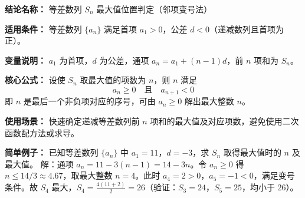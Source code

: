 \textbf{结论名称：} 等差数列 \(S_n\) 最大值位置判定（邻项变号法）

\textbf{适用条件：} 等差数列 \(\{a_n\}\) 满足首项 \(a_1>0\)，公差 \(d<0\)（递减数列且首项为正）。

\textbf{变量说明：} \(a_1\) 为首项，\(d\) 为公差，通项 \(a_n=a_1+(n-1)d\)，前 \(n\) 项和为 \(S_n\)。

\textbf{核心公式：} 设使 \(S_n\) 取最大值的项数为 \(n\)，则 \(n\) 满足
\[
\boxed{a_n \ge 0 \quad \text{且} \quad a_{n+1} < 0}
\]
即 \(n\) 是最后一个非负项对应的序号，可由 \(a_n \ge 0\) 解出最大整数 \(n\)。

\textbf{使用场景：} 快速确定递减等差数列前 \(n\) 项和的最大值及对应项数，避免使用二次函数配方法或求导。

\textbf{简单例子：} 已知等差数列 \(\{a_n\}\) 中 \(a_1=11\)，\(d=-3\)，求 \(S_n\) 取得最大值时的 \(n\) 及最大值。
解：通项 \(a_n=11-3(n-1)=14-3n\)。令 \(a_n\ge 0\) 得 \(n\le 14/3\approx 4.67\)，取最大整数 \(n=4\)。此时 \(a_4=2>0\)，\(a_5=-1<0\)，满足变号条件。故 \(S_4\) 最大，\(S_4=\frac{4(11+2)}{2}=26\)（验证：\(S_3=24\)，\(S_5=25\)，均小于 26）。